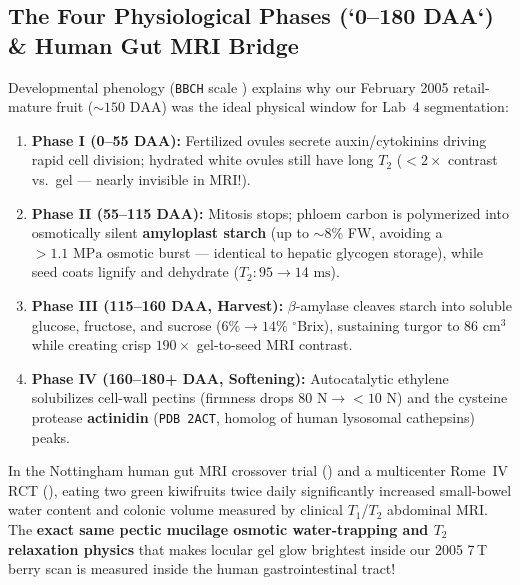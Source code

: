 \documentclass[10.5pt,a4paper]{article}
\begin{document}
\subsection{The Four Physiological Phases (`0--180 DAA`) \& Human Gut MRI Bridge}

Developmental phenology (\texttt{BBCH} scale \cite{richardson2011}) explains why our February 2005 retail-mature fruit ($\sim 150\text{ DAA}$) was the ideal physical window for Lab~4 segmentation:
\begin{enumerate}
    \item \textbf{Phase I (0--55 DAA):} Fertilized ovules secrete auxin/cytokinins driving rapid cell division; hydrated white ovules still have long $T_2$ ($<2\times$ contrast vs.\ gel --- nearly invisible in MRI!).
    \item \textbf{Phase II (55--115 DAA):} Mitosis stops; phloem carbon is polymerized into osmotically silent \textbf{amyloplast starch} (up to $\sim 8\%$ FW, avoiding a $>1.1\text{ MPa}$ osmotic burst --- identical to hepatic glycogen storage), while seed coats lignify and dehydrate ($T_2: 95 \to 14\text{ ms}$).
    \item \textbf{Phase III (115--160 DAA, Harvest):} $\beta$-amylase cleaves starch into soluble glucose, fructose, and sucrose ($6\% \to 14\%$ $^\circ\text{Brix}$), sustaining turgor to $86\text{ cm}^3$ while creating crisp $190\times$ gel-to-seed MRI contrast.
    \item \textbf{Phase IV (160--180+ DAA, Softening):} Autocatalytic ethylene solubilizes cell-wall pectins (firmness drops $80\text{ N} \to <10\text{ N}$) and the cysteine protease \textbf{actinidin} (\texttt{PDB 2ACT}, homolog of human lysosomal cathepsins) peaks.
\end{enumerate}

\begin{infobox}
In the Nottingham human gut MRI crossover trial (\cite{wilkinsonsmith2019}) and a multicenter Rome~IV RCT (\cite{gearry2023}), eating two green kiwifruits twice daily significantly increased small-bowel water content and colonic volume measured by clinical $T_1$/$T_2$ abdominal MRI. The \textbf{exact same pectic mucilage osmotic water-trapping and $T_2$ relaxation physics} that makes locular gel glow brightest inside our 2005 7\,T berry scan is measured inside the human gastrointestinal tract!
\end{infobox}

\end{document}
